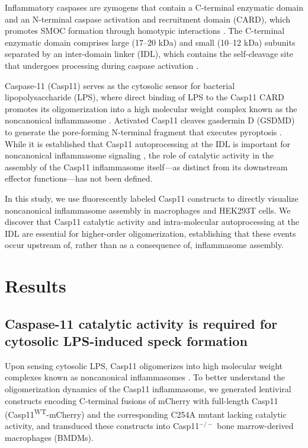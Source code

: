 \documentclass[11pt]{article}
\begin{document}
Inflammatory caspases are zymogens that contain a C-terminal enzymatic domain and an N-terminal caspase activation and recruitment domain (CARD), which promotes SMOC formation through homotypic interactions \citep{martinon2009inflammasome,latz2012inflammasomes}. The C-terminal enzymatic domain comprises large (17--20 kDa) and small (10--12 kDa) subunits separated by an inter-domain linker (IDL), which contains the self-cleavage site that undergoes processing during caspase activation \citep{boatright2003interdimer}.

Caspase-11 (Casp11) serves as the cytosolic sensor for bacterial lipopolysaccharide (LPS), where direct binding of LPS to the Casp11 CARD promotes its oligomerization into a high molecular weight complex known as the noncanonical inflammasome \citep{shi2014cytoplasmic,kayagaki2013noncanonical,hagar2013cytoplasmic}. Activated Casp11 cleaves gasdermin D (GSDMD) to generate the pore-forming N-terminal fragment that executes pyroptosis \citep{kayagaki2015caspase11,aglietti2016gsdmd}. While it is established that Casp11 autoprocessing at the IDL is important for noncanonical inflammasome signaling \citep{lee2018caspase11,ross2018casp11}, the role of catalytic activity in the assembly of the Casp11 inflammasome itself---as distinct from its downstream effector functions---has not been defined.

In this study, we use fluorescently labeled Casp11 constructs to directly visualize noncanonical inflammasome assembly in macrophages and HEK293T cells. We discover that Casp11 catalytic activity and intra-molecular autoprocessing at the IDL are essential for higher-order oligomerization, establishing that these events occur upstream of, rather than as a consequence of, inflammasome assembly.

\section{Results}

\subsection{Caspase-11 catalytic activity is required for cytosolic LPS-induced speck formation}

Upon sensing cytosolic LPS, Casp11 oligomerizes into high molecular weight complexes known as noncanonical inflammasomes \citep{shi2014cytoplasmic}. To better understand the oligomerization dynamics of the Casp11 inflammasome, we generated lentiviral constructs encoding C-terminal fusions of mCherry with full-length Casp11 (Casp11\textsuperscript{WT}-mCherry) and the corresponding C254A mutant lacking catalytic activity, and transduced these constructs into Casp11$^{-/-}$ bone marrow-derived macrophages (BMDMs).
\end{document}
